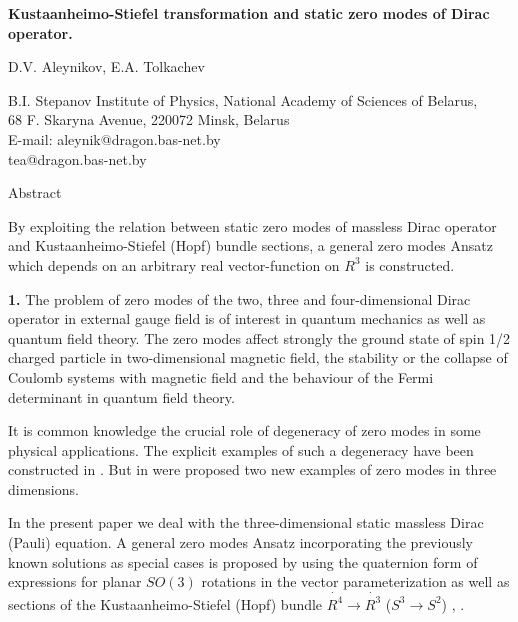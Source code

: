 \documentclass[12pt,a4paper]{article}
\begin{document}
\begin{center}
{\large \bf Kustaanheimo-Stiefel transformation and static zero modes of
Dirac operator.}
\end{center}
\begin{center}
\large D.V. Aleynikov, E.A. Tolkachev
\end{center}
\begin{center}
{B.I. Stepanov Institute of Physics, National Academy of
Sciences of Belarus, \\ 68 F. Skaryna Avenue, 220072 Minsk,
Belarus\\ {\small \rm
   E-mail:     aleynik@dragon.bas-net.by \\ \hspace{1cm} tea@dragon.bas-net.by}}
\end{center}
\begin{center}
Abstract
\end{center}

{\small{By exploiting the relation between static zero modes of massless Dirac operator and
Kustaanheimo-Stiefel (Hopf) bundle sections, a general zero modes Ansatz which
depends on an arbitrary real vector-function on $R^3$ is constructed.}}

\vspace{1cm}
{\bf 1.} The problem of zero modes of the two, three and four-dimensional Dirac operator
in external gauge field is of interest in quantum mechanics as well as quantum
field theory. The zero modes affect strongly the ground state of spin 1/2 charged
particle in two-dimensional magnetic field, the stability or the collapse of
Coulomb systems with magnetic field and the behaviour of the Fermi determinant
in quantum field theory.

It is common knowledge \cite{Fry} the crucial role of degeneracy of zero modes in some physical
applications. The explicit examples of such a degeneracy have been constructed
in \cite{Nash}. But in \cite{Elton} were proposed two new examples of zero
modes in three dimensions.

In the present paper we deal with the three-dimensional static massless Dirac (Pauli) equation.
A general zero modes Ansatz  incorporating the previously known
solutions as special cases is proposed by using the quaternion form of expressions for  planar
$SO(3)$ rotations in the vector parameterization  \cite{Fedorov} as well as sections of
the Kustaanheimo-Stiefel (Hopf) bundle $\dot{R^4}\rightarrow \dot{R^3}$ ($S^3\rightarrow S^2$)
\cite{Pris1}, \cite{Pris2}.
\end{document}
